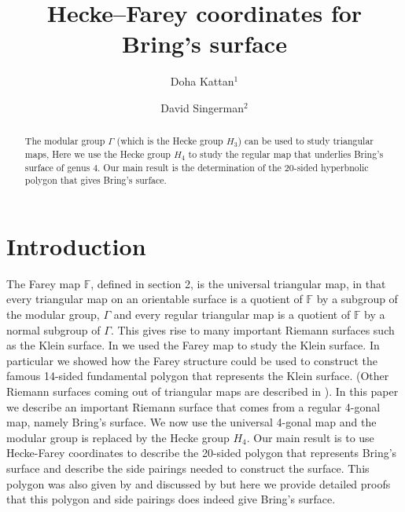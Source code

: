 \documentclass{amsproc}
\numberwithin{equation}{section}
\numberwithin{equation}{section}
\theoremstyle{definition}
\theoremstyle{remark}
\numberwithin{equation}{section}
\begin{document}
 
 
 \begin{abstract} 
 The modular group $\Gamma$ (which is the Hecke group $H_3$) can be used to study triangular maps,  Here we use the Hecke group $H_4$ to study the regular map that underlies Bring's surface of genus 4. Our main result is the determination of the 20-sided hyperbnolic polygon that gives Bring's surface.
 \end{abstract}


\title{Hecke--Farey coordinates for Bring's surface}

\author{Doha Kattan$^1$}
 \address{$^1$Department of Mathematics, Faculty of Science and Arts, King Abdulaziz University, Rabigh, Saudi Arabia}
\author{David Singerman$^2$}
 \address{$^2$School of Mathematical Sciences, University of Southampton, UK}

\maketitle

\section{Introduction} The Farey map $\mathbb{F}$, defined in section 2, is the universal triangular map, in that every triangular map on an orientable surface is a quotient of $\mathbb{F}$ by a subgroup of the modular  group, $\Gamma$ and every regular triangular map is a quotient of $\mathbb{F}$ by a normal subgroup of $\Gamma.$  This gives rise to many important Riemann surfaces such as the Klein surface.  In \cite{ISS} we used the Farey map to study the Klein surface.  In particular we showed how the Farey structure could be used to construct the famous 14-sided fundamental polygon that represents the Klein surface. (Other Riemann surfaces coming out of triangular maps are described in \cite{SS16}). In this paper we describe an important Riemann  surface that comes from a regular 4-gonal map,  namely Bring's surface.  We now use the universal 4-gonal map and the modular group is replaced by the Hecke group $H_4$.  Our main  result is to use Hecke-Farey coordinates to describe the 20-sided polygon that represents Bring's surface and describe the side pairings
needed to construct the surface.  This polygon was also given by \cite{RR92} and discussed by \cite{BN12} but here we provide detailed proofs that this polygon and side pairings does indeed give Bring's surface.
\end{document}
